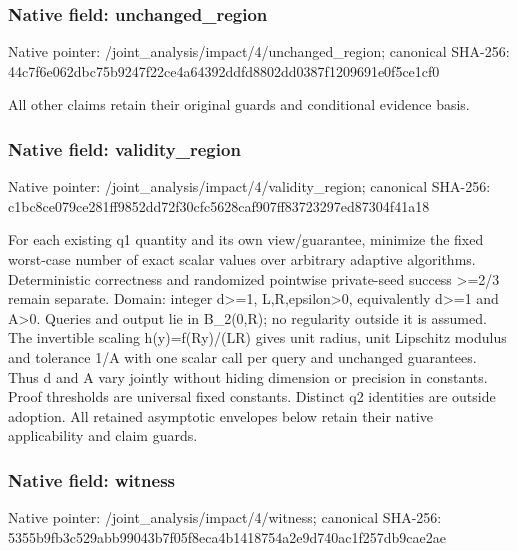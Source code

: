\documentclass[10pt,a4paper]{article}
\begin{document}
\subsubsection{Native field: unchanged\_\allowbreak{}region}
Native pointer: /joint\_\allowbreak{}analysis/impact/4/unchanged\_\allowbreak{}region; canonical SHA-256: 44c7f6e062dbc75b9247f22ce4a64392ddfd8802dd0387f1209691e0f5ce1cf0

\begingroup\raggedright\sloppy All other claims retain their original guards and conditional evidence basis.\par\endgroup

\subsubsection{Native field: validity\_\allowbreak{}region}
Native pointer: /joint\_\allowbreak{}analysis/impact/4/validity\_\allowbreak{}region; canonical SHA-256: c1bc8ce079ce281ff9852dd72f30cfc5628caf907ff83723297ed87304f41a18

\begingroup\raggedright\sloppy For each existing q1 quantity and its own view/\allowbreak{}guarantee,\allowbreak{} minimize the fixed worst-case number of exact scalar values over arbitrary adaptive algorithms. Deterministic correctness and randomized pointwise private-seed success >=\allowbreak{}2/\allowbreak{}3 remain separate. Domain:\allowbreak{} integer d>=\allowbreak{}1,\allowbreak{} L,\allowbreak{}R,\allowbreak{}epsilon>0,\allowbreak{} equivalently d>=\allowbreak{}1 and A>0. Queries and output lie in B\_\allowbreak{}2(0,\allowbreak{}R);\allowbreak{} no regularity outside it is assumed. The invertible scaling h(y)=\allowbreak{}f(Ry)/\allowbreak{}(LR) gives unit radius,\allowbreak{} unit Lipschitz modulus and tolerance 1/\allowbreak{}A with one scalar call per query and unchanged guarantees. Thus d and A vary jointly without hiding dimension or precision in constants. Proof thresholds are universal fixed constants. Distinct q2 identities are outside adoption. All retained asymptotic envelopes below retain their native applicability and claim guards.\par\endgroup

\subsubsection{Native field: witness}
Native pointer: /joint\_\allowbreak{}analysis/impact/4/witness; canonical SHA-256: 5355b9fb3c529abb99043b7f05f8eca4b1418754a2e9d740ac1f257db9cae2ae
\end{document}

